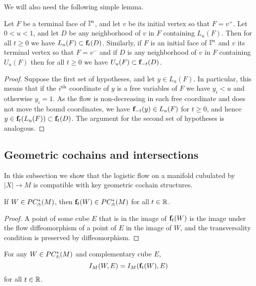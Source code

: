 We will also need the following simple lemma.

\begin{lemma}\label{L:domain flow}
	Let $F$ be a terminal face of $\mathbb{I}^n$, and let $v$ be its initial vertex so that $F=v^+$.
	Let $0<u<1$, and let $D$ be any neighborhood of $v$ in $F$ containing $L_u(F)$.
	Then for all $t\geq 0$ we have $L_u(F)\subset \mathbf{f}_t(D)$.
	Similarly, if $F$ is an initial face of $\mathbb{I}^n$ and $v$ its terminal vertex so that $F=v^-$ and if $D$ is any neighborhood of $v$ in $F$ containing $U_u(F)$ then for all $t\geq 0$ we have $U_u(F)\subset \mathbf{f}_{-t}(D)$.
\end{lemma}

\begin{proof}
	Suppose the first set of hypotheses, and let $y \in L_u(F)$.
	In particular, this means that if the $i^{\mathrm{th}}$ coordinate of $y$ is a free variables of $F$ we have $y_i < u$ and otherwise $y_i = 1$.
	As the flow is non-decreasing in each free coordinate and does not move the bound coordinates, we have $\mathbf{f}_{-t}(y)\in L_u(F)$ for $t\geq 0$, and hence $y \in \mathbf{f}_t(L_u(F)) \subset \mathbf{f}_t(D)$.
	The argument for the second set of hypotheses is analogous.
\end{proof}

\subsection{Geometric cochains and intersections}

In this subsection we show that the logistic flow on a manifold cubulated by $|X| \to M$ is compatible with key geometric cochain structures.

\begin{lemma}\label{L:flow preserves transversality}
	If $W \in PC_{\pitchfork}^*(M)$, then $\mathbf{f}_t(W)\in PC_{\pitchfork}^*(M)$ for all $t \in \mathbb{R}$.
\end{lemma}

\begin{proof}
	A point of some cube $E$ that is in the image of $\mathbf{f}_t(W)$ is the image under the flow diffeomorphism of a point of $E$ in the image of $W$, and the transversality condition is preserved by diffeomorphism.
\end{proof}

\begin{lemma}
	For any $W \in PC_{\pitchfork}^*(M)$ and complementary cube $E$,
	\begin{equation*}
		I_M(W, E) = I_M(\mathbf{f}_t(W), E)
	\end{equation*}
	for all $t \in \mathbb{R}$.
\end{lemma}

